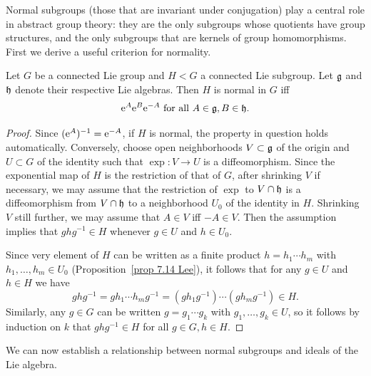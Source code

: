 Normal subgroups (those that are invariant under conjugation) play a central role in abstract group theory: they are the only subgroups whose quotients have group structures, and the only subgroups that are kernels of group homomorphisms. First we derive a useful criterion for normality.

\begin{lem}\label{lem 20.23 Lee}
    Let $G$ be a connected Lie group and $H<G$ a connected Lie subgroup. Let $\mathfrak{g}$ and $\mathfrak{h}$ denote their respective Lie algebras. Then $H$ is normal in $G$ iff
    \[\mathrm{e}^A \mathrm{e}^B \mathrm{e}^{-A} \text{ for all }A\in \mathfrak{g},B\in\mathfrak{h}.\]
\end{lem}
\begin{proof}
    Since $(\mathrm{e}^A)^{-1}=\mathrm{e}^{-A}$, if $H$ is normal, the property in question holds automatically. Conversely, choose open neighborhoods $V\subset \mathfrak{g}$ of the origin and $U\subset G$ of the identity such that $\exp:V\to U$ is a diffeomorphism. Since the exponential map of $H$ is the restriction of that of $G$, after shrinking $V$ if necessary, we may assume that the restriction of $\exp$ to $V\cap \mathfrak{h}$ is a diffeomorphism from $V\cap \mathfrak{h}$ to a neighborhood $U_0$ of the identity in $H$. Shrinking $V$ still further, we may assume that $A\in V$ iff $-A\in V$. Then the assumption implies that $ghg^{-1}\in H$ whenever $g\in U$ and $h\in U_0$.

    Since very element of $H$ can be written as a finite product $h=h_1\cdots h_m$ with $h_1,\ldots, h_m\in U_0$ (Proposition~\ref{prop 7.14 Lee}), it follows that for any $g\in U$ and $h\in H$ we have
    \[ghg^{-1}=gh_1\cdots h_m g^{-1}=(gh_1g^{-1})\cdots (gh_m g^{-1})\in H.\]
    Similarly, any $g\in G$ can be written $g=g_1\cdots g_k$ with $g_1,\ldots, g_k\in U$, so it follows by induction on $k$ that $ghg^{-1}\in H$ for all $g\in G,h\in H$.
\end{proof}


We can now establish a relationship between normal subgroups and ideals of the Lie algebra.

